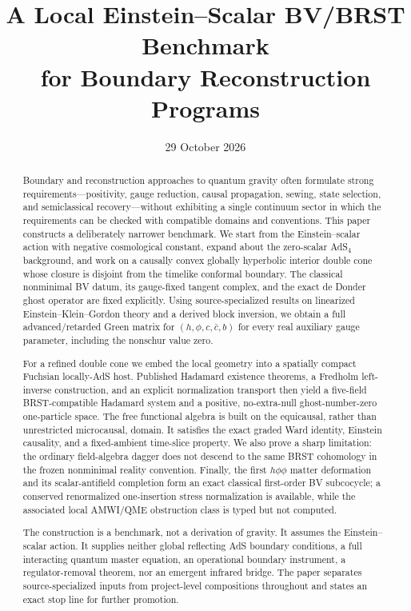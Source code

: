 \documentclass[11pt]{article}
\title{A Local Einstein--Scalar BV/BRST Benchmark\\
for Boundary Reconstruction Programs}
\author{}
\date{29 October 2026}
\theoremstyle{definition}
\theoremstyle{remark}
\begin{document}
\maketitle

\begin{abstract}
Boundary and reconstruction approaches to quantum gravity often formulate strong
requirements---positivity, gauge reduction, causal propagation, sewing, state
selection, and semiclassical recovery---without exhibiting a single continuum sector
in which the requirements can be checked with compatible domains and conventions.
This paper constructs a deliberately narrower benchmark.  We start from the
Einstein--scalar action with negative cosmological constant, expand about the
zero-scalar AdS$_4$ background, and work on a causally convex globally hyperbolic
interior double cone whose closure is disjoint from the timelike conformal boundary.
The classical nonminimal BV datum, its gauge-fixed tangent complex, and the exact
de Donder ghost operator are fixed explicitly.  Using source-specialized results on
linearized Einstein--Klein--Gordon theory and a derived block inversion, we obtain a
full advanced/retarded Green matrix for $(h,\phi,c,\bar c,b)$ for every real auxiliary
gauge parameter, including the nonschur value zero.

For a refined double cone we embed the local geometry into a spatially compact
Fuchsian locally-AdS host.  Published Hadamard existence theorems, a Fredholm
left-inverse construction, and an explicit normalization transport then yield a
five-field BRST-compatible Hadamard system and a positive, no-extra-null
ghost-number-zero one-particle space.  The free functional algebra is built on the
equicausal, rather than unrestricted microcausal, domain.  It satisfies the exact
graded Ward identity, Einstein causality, and a fixed-ambient time-slice property.
We also prove a sharp limitation: the ordinary field-algebra dagger does not descend
to the same BRST cohomology in the frozen nonminimal reality convention.  Finally, the
first $h\phi\phi$ matter deformation and its scalar-antifield completion form an exact
classical first-order BV subcocycle; a conserved renormalized one-insertion stress
normalization is available, while the associated local AMWI/QME obstruction class is
typed but not computed.

The construction is a benchmark, not a derivation of gravity.  It assumes the
Einstein--scalar action.  It supplies neither global reflecting AdS boundary
conditions, a full interacting quantum master equation, an operational boundary
instrument, a regulator-removal theorem, nor an emergent infrared bridge.  The paper
separates source-specialized inputs from project-level compositions throughout and
states an exact stop line for further promotion.
\end{abstract}
\end{document}
